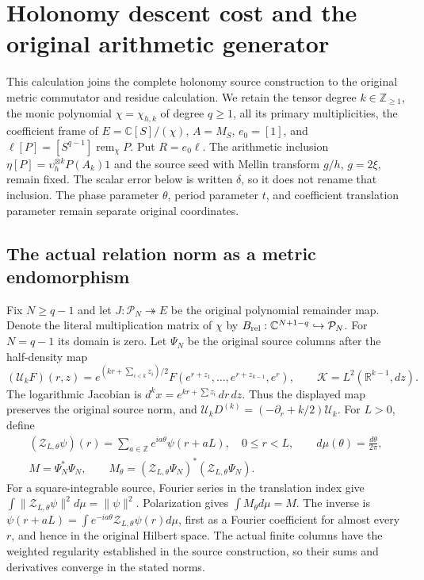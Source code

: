 \section{Holonomy descent cost and the original arithmetic generator}
\label{sec:holonomy-generator-control}

This calculation joins the complete holonomy source construction to the
original metric commutator and residue calculation. We retain the tensor
degree $k\in\mathbb Z_{\ge1}$, the monic polynomial $\chi=\chi_{h,k}$ of
degree $q\ge1$, all its primary multiplicities, the coefficient frame of
$E=\mathbb C[S]/(\chi)$, $A=M_S$, $e_0=[1]$, and
$\ell[P]=[S^{q-1}]\operatorname{rem}_{\chi}P$. Put $R=e_0\ell$.
The arithmetic inclusion $\eta[P]=\upsilon_h^{\otimes k}P(A_k)1$ and
the source seed with Mellin transform $g/h$, $g=2\xi$, remain fixed.
The scalar error below is written $\delta$, so it does not rename that
inclusion. The phase parameter $\theta$, period parameter $t$, and
coefficient translation parameter remain separate original coordinates.

\subsection{The actual relation norm as a metric endomorphism}

Fix $N\ge q-1$ and let $J:\mathcal P_N\twoheadrightarrow E$ be the
original polynomial remainder map. Denote the literal multiplication
matrix of $\chi$ by $B_{\rm rel}:\mathbb C^{N+1-q}\hookrightarrow
\mathcal P_N$. For $N=q-1$ its domain is zero. Let $\Psi_N$ be the
original source columns after the half-density map
\[
 (\mathcal U_k F)(r,z)=e^{(kr+\sum_{i<k}z_i)/2}
 F(e^{r+z_1},\ldots,e^{r+z_{k-1}},e^r),\qquad
 \mathcal K=L^2(\mathbb R^{k-1},dz).
 \tag{HG1}
\]
The logarithmic Jacobian is $d^kx=e^{kr+\sum z_i}\,dr\,dz$.
Thus the displayed map preserves the original source norm, and
$\mathcal U_kD^{(k)}=(-\partial_r+k/2)\mathcal U_k$.
For $L>0$, define
\[
\begin{gathered}
 (\mathcal Z_{L,\theta}\psi)(r)=
       \sum_{a\in\mathbb Z}e^{ia\theta}\psi(r+aL),\quad 0\le r<L,
 \qquad d\mu(\theta)=\frac{d\theta}{2\pi},\\
 M=\Psi_N^*\Psi_N,\qquad
 M_\theta=(\mathcal Z_{L,\theta}\Psi_N)^*
                    (\mathcal Z_{L,\theta}\Psi_N).
\end{gathered}\tag{HG2}
\]
For a square-integrable source, Fourier series in the translation index
give $\int\|\mathcal Z_{L,\theta}\psi\|^2d\mu=\|\psi\|^2$.
Polarization gives $\int M_\theta d\mu=M$. The inverse is
$\psi(r+aL)=\int e^{-ia\theta}\mathcal Z_{L,\theta}\psi(r)d\mu$,
first as a Fourier coefficient for almost every $r$, and hence in the
original Hilbert space. The actual finite columns have the weighted
regularity established in the source construction, so their sums and
derivatives converge in the stated norms.

